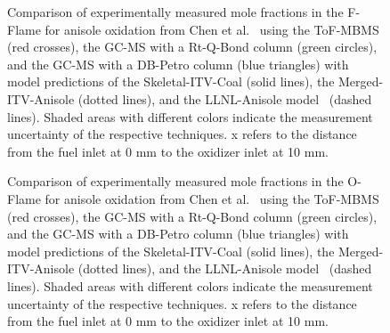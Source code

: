 \begin{refsection}
\begin{figure}[h]
  \centering
  \hfill
  \hfill
  \hfill
  \hfill
  \hfill
  \caption{Comparison of experimentally measured mole fractions in the F-Flame for anisole oxidation from Chen et al.~\cite{Chen2022} using the ToF-MBMS (red crosses), the GC-MS with a Rt-Q-Bond column (green circles), and the GC-MS with a DB-Petro column (blue triangles) with model predictions of the Skeletal-ITV-Coal (solid lines), the Merged-ITV-Anisole (dotted lines), and the LLNL-Anisole model~\cite{Wagnon2018} (dashed lines). Shaded areas with different colors indicate the measurement uncertainty of the respective techniques. x refers to the distance from the fuel inlet at 0 mm to the oxidizer inlet at 10 mm.}
  \label{fig:B1bAnisoleOxidationCoalMechanismCO2F}
\end{figure}
\begin{figure}[h]
  \centering
  \hfill
  \hfill
  \hfill
  \hfill
  \hfill
  \caption{Comparison of experimentally measured mole fractions in the O-Flame for anisole oxidation from Chen et al.~\cite{Chen2022} using the ToF-MBMS (red crosses), the GC-MS with a Rt-Q-Bond column (green circles), and the GC-MS with a DB-Petro column (blue triangles) with model predictions of the Skeletal-ITV-Coal (solid lines), the Merged-ITV-Anisole (dotted lines), and the LLNL-Anisole model~\cite{Wagnon2018} (dashed lines). Shaded areas with different colors indicate the measurement uncertainty of the respective techniques. x refers to the distance from the fuel inlet at 0 mm to the oxidizer inlet at 10 mm.}
  \label{fig:B1bAnisoleOxidationCoalMechanismCO2O}
\end{figure}




\end{refsection}
